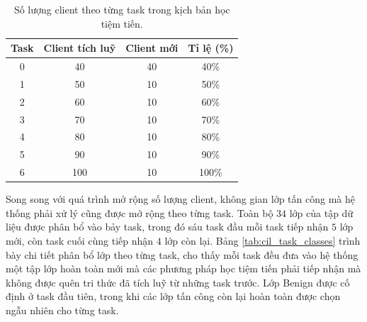 \begin{table}[H]
    \centering
    \caption{Số lượng client theo từng task trong kịch bản học tiệm tiến.}
    \label{tab:cil_client_growth}
    \begin{tabular}{cccc}
        \hline
        Task & Client tích luỹ & Client mới & Tỉ lệ (\%) \\
        \hline
        0 & 40  & 40 & 40\% \\
        1 & 50  & 10 & 50\% \\
        2 & 60  & 10 & 60\% \\
        3 & 70  & 10 & 70\% \\
        4 & 80  & 10 & 80\% \\
        5 & 90  & 10 & 90\% \\
        6 & 100 & 10 & 100\% \\
        \hline
    \end{tabular}
\end{table}

Song song với quá trình mở rộng số lượng client, không gian lớp tấn công mà hệ thống phải xử lý cũng được mở rộng theo từng task. Toàn bộ $34$ lớp của tập dữ liệu được phân bổ vào bảy task, trong đó sáu task đầu mỗi task tiếp nhận $5$ lớp mới, còn task cuối cùng tiếp nhận $4$ lớp còn lại. Bảng \ref{tab:cil_task_classes} trình bày chi tiết phân bổ lớp theo từng task, cho thấy mỗi task đều đưa vào hệ thống một tập lớp hoàn toàn mới mà các phương pháp học tiệm tiến phải tiếp nhận mà không được quên tri thức đã tích luỹ từ những task trước. Lớp Benign được cố định ở task đầu tiên, trong khi các lớp tấn công còn lại hoàn toàn được chọn ngẫu nhiên cho từng task.

